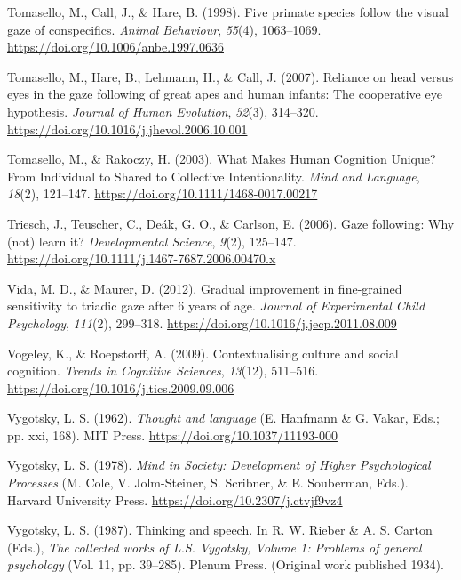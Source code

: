 \documentclass[
]{scrbook}
\newlength{\cslhangindent}
\newenvironment{CSLReferences}[2] %
 {\begin{list}{}{%
  \setlength{\itemindent}{0pt}
  \setlength{\leftmargin}{0pt}
  \setlength{\parsep}{0pt}
  \ifodd #1
   \setlength{\leftmargin}{\cslhangindent}
   \setlength{\itemindent}{-1\cslhangindent}
  \fi
  \setlength{\itemsep}{#2\baselineskip}}}
 {\end{list}}
\begin{document}
\begin{CSLReferences}{1}{0}
Tomasello, M., Call, J., \& Hare, B. (1998). Five primate species follow the visual gaze of conspecifics. \emph{Animal Behaviour}, \emph{55}(4), 1063--1069. \url{https://doi.org/10.1006/anbe.1997.0636}

Tomasello, M., Hare, B., Lehmann, H., \& Call, J. (2007). Reliance on head versus eyes in the gaze following of great apes and human infants: The cooperative eye hypothesis. \emph{Journal of Human Evolution}, \emph{52}(3), 314--320. \url{https://doi.org/10.1016/j.jhevol.2006.10.001}

Tomasello, M., \& Rakoczy, H. (2003). What {Makes Human Cognition Unique}? {From Individual} to {Shared} to {Collective Intentionality}. \emph{Mind and Language}, \emph{18}(2), 121--147. \url{https://doi.org/10.1111/1468-0017.00217}

Triesch, J., Teuscher, C., Deák, G. O., \& Carlson, E. (2006). Gaze following: Why (not) learn it? \emph{Developmental Science}, \emph{9}(2), 125--147. \url{https://doi.org/10.1111/j.1467-7687.2006.00470.x}

Vida, M. D., \& Maurer, D. (2012). Gradual improvement in fine-grained sensitivity to triadic gaze after 6 years of age. \emph{Journal of Experimental Child Psychology}, \emph{111}(2), 299--318. \url{https://doi.org/10.1016/j.jecp.2011.08.009}

Vogeley, K., \& Roepstorff, A. (2009). Contextualising culture and social cognition. \emph{Trends in Cognitive Sciences}, \emph{13}(12), 511--516. \url{https://doi.org/10.1016/j.tics.2009.09.006}

Vygotsky, L. S. (1962). \emph{Thought and language} (E. Hanfmann \& G. Vakar, Eds.; pp. xxi, 168). MIT Press. \url{https://doi.org/10.1037/11193-000}

Vygotsky, L. S. (1978). \emph{Mind in {Society}: {Development} of {Higher Psychological Processes}} (M. Cole, V. Jolm-Steiner, S. Scribner, \& E. Souberman, Eds.). Harvard University Press. \url{https://doi.org/10.2307/j.ctvjf9vz4}

Vygotsky, L. S. (1987). Thinking and speech. In R. W. Rieber \& A. S. Carton (Eds.), \emph{The collected works of {L}.{S}. {Vygotsky}, {Volume} 1: {Problems} of general psychology} (Vol. 11, pp. 39--285). Plenum Press. (Original work published 1934).


\end{CSLReferences}
\end{document}
